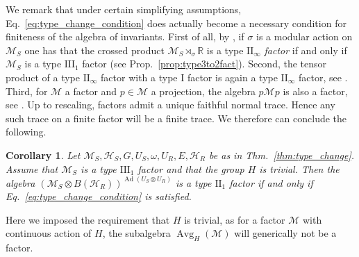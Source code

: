 \documentclass[sn-mathphys-num]{sn-jnl}%
\newcommand{\RR}{\mathbb{R}}
\newcommand{\HH}{\mathcal{H}}
\newcommand{\MM}{\mathcal{M}}
\DeclareMathOperator{\Ad}{Ad}
\numberwithin{equation}{section}
\theoremstyle{thmstyleone}%
\newtheorem{corollary}[theorem]{Corollary}
\theoremstyle{thmstyletwo}%
\theoremstyle{thmstylethree}%
\begin{document}
We remark that under certain simplifying assumptions, Eq.\ \eqref{eq:type_change_condition} does actually become a necessary condition for finiteness of the algebra of invariants. First of all, by \cite{Takesaki1973duality}, if $\sigma$ is a modular action on $\MM_S$ one has that the crossed product $\MM_S\rtimes_{\sigma}\RR$ is a type $\mathrm{II}_\infty$ \textit{factor} if and only if $\MM_S$ is a type $\mathrm{III}_1$ factor (see Prop.\ \ref{prop:type3to2fact}). Second, the tensor product of a type $\mathrm{II}_\infty$ factor with a type $\mathrm{I}$ factor is again a type $\mathrm{II}_\infty$ factor, see \cite[Thm.~11.2.27, Prop.~11.2.21-22]{kadison1997fundamentals}. Third, for $\MM$ a factor and $p\in\MM$ a projection, the algebra $p\MM p$ is also a factor, see \cite[Ch. 2.1.]{dixmier1981VonNeumann}. Up to rescaling, factors admit a unique faithful normal trace. Hence any such trace on a finite factor will be a finite trace. We therefore can conclude the following.
\begin{corollary}
    \label{cor:III1_type_change}
    Let $\MM_S, \HH_S, G, U_S, \omega, U_R, E,\HH_R$ be as in Thm.\ \ref{thm:type_change}. Assume that $\MM_S$ is a type $\mathrm{III}_1$ factor and that the group $H$ is trivial. Then the algebra $(\MM_S\otimes B(\HH_R))^{\Ad (U_S\otimes U_R)}$ is a type $\mathrm{II}_1$ factor if and only if Eq.\ \eqref{eq:type_change_condition} is satisfied.
\end{corollary}
Here we imposed the requirement that $H$ is trivial, as for a factor $\MM$ with continuous action of $H$, the subalgebra $\operatorname{Avg}_H(\MM)$ will generically not be a factor. 
\end{document}
